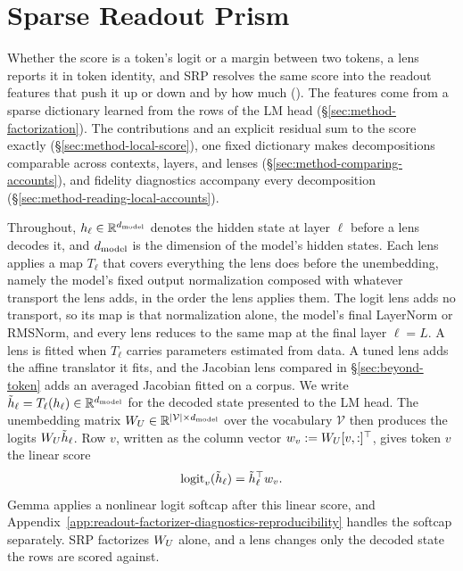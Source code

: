 \section{Sparse Readout Prism}
\label{sec:method}

Whether the score is a token's logit or a margin between two tokens, a
lens reports it in token identity, and SRP resolves the same score into
the readout features that push it up or down and by how much
(). The features come from a sparse
dictionary learned from the rows of the LM head
(\S\ref{sec:method-factorization}).
The contributions and an explicit residual sum to the score exactly
(\S\ref{sec:method-local-score}), one fixed dictionary makes
decompositions comparable across contexts, layers, and lenses
(\S\ref{sec:method-comparing-accounts}), and fidelity diagnostics
accompany every decomposition
(\S\ref{sec:method-reading-local-accounts}).

Throughout, \(h_\ell\in\mathbb{R}^{d_{\mathrm{model}}}\) denotes the hidden state at layer
\(\ell\) before a lens decodes it, and \(d_{\mathrm{model}}\) is the
dimension of the model's hidden states. Each lens applies a map
\(T_\ell\) that covers everything the lens does before the
unembedding, namely the model's fixed output normalization composed
with whatever transport the lens adds, in the order the lens applies
them. The logit lens adds no transport, so its map is that
normalization alone, the model's final LayerNorm or RMSNorm, and every
lens reduces to the same map at the final layer \(\ell=L\). A lens is fitted when \(T_\ell\) carries
parameters estimated from data. A tuned lens adds the affine
translator it fits, and the Jacobian lens compared in
\S\ref{sec:beyond-token} adds an averaged Jacobian fitted on a corpus.
We write \(\tilde h_\ell=T_\ell(h_\ell)\in\mathbb{R}^{d_{\mathrm{model}}}\) for the
decoded state presented to the LM head. The unembedding matrix
\(W_U\in\mathbb{R}^{|\mathcal{V}|\times d_{\mathrm{model}}}\) over the vocabulary
\(\mathcal{V}\) then produces the logits \(W_U\tilde h_\ell\). Row \(v\),
written as the column vector \(w_v:=W_U[v,:]^\top\), gives token \(v\)
the linear score
\[
    \operatorname{logit}_v(\tilde h_\ell)=\tilde h_\ell^\top w_v.
\]
Gemma applies a nonlinear logit softcap after this linear score, and
Appendix~\ref{app:readout-factorizer-diagnostics-reproducibility}
handles the softcap separately. SRP factorizes \(W_U\) alone, and a
lens changes only the decoded state the rows are scored against.

